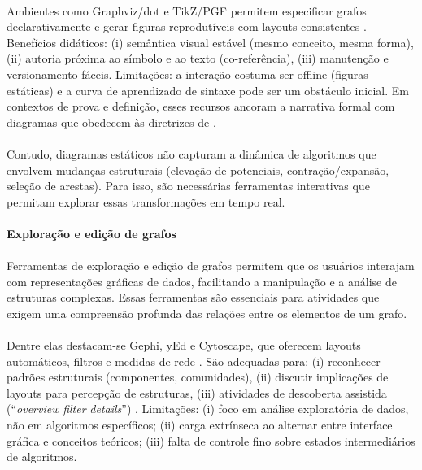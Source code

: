 \documentclass[12pt,a4paper]{article}
\begin{document}
\paragraph{}
Ambientes como Graphviz/dot e TikZ/PGF permitem especificar grafos declarativamente e gerar figuras reprodutíveis com layouts consistentes \cite{graphviz,tantau2015tikz}. Benefícios didáticos: (i) semântica visual estável (mesmo conceito, mesma forma), (ii) autoria próxima ao símbolo e ao texto (co-referência), (iii) manutenção e versionamento fáceis. Limitações: a interação costuma ser offline (figuras estáticas) e a curva de aprendizado de sintaxe pode ser um obstáculo inicial. Em contextos de prova e definição, esses recursos ancoram a narrativa formal com diagramas que obedecem às diretrizes de \cite{larkin1987diagram,ware2012information}.

\paragraph{}
Contudo, diagramas estáticos não capturam a dinâmica de algoritmos que envolvem mudanças estruturais (elevação de potenciais, contração/expansão, seleção de arestas). Para isso, são necessárias ferramentas interativas que permitam explorar essas transformações em tempo real.

\paragraph{Exploração e edição de grafos}
\paragraph{}
Ferramentas de exploração e edição de grafos permitem que os usuários interajam com representações gráficas de dados, facilitando a manipulação e a análise de estruturas complexas. Essas ferramentas são essenciais para atividades que exigem uma compreensão profunda das relações entre os elementos de um grafo.


\paragraph{}
Dentre elas destacam-se Gephi, yEd e Cytoscape, que oferecem layouts automáticos, filtros e medidas de rede \cite{bastian2009gephi,yed,shannon2003cytoscape}. São adequadas para: (i) reconhecer padrões estruturais (componentes, comunidades), (ii) discutir implicações de layouts para percepção de estruturas, (iii) atividades de descoberta assistida (``\textit{overview} \textrightarrow{} \textit{filter} \textrightarrow{} \textit{details}'') \cite{shneiderman1996eyes}. Limitações: (i) foco em análise exploratória de dados, não em algoritmos específicos; (ii) carga extrínseca ao alternar entre interface gráfica e conceitos teóricos; (iii) falta de controle fino sobre estados intermediários de algoritmos.
\end{document}
